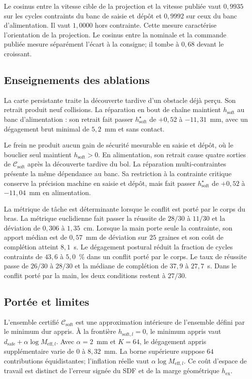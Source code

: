 Le cosinus entre la vitesse cible de la projection et la vitesse publiée vaut $0{,}9935$ sur les cycles contraints du banc de saisie et dépôt et $0{,}9992$ sur ceux du banc d'alimentation. Il vaut $1{,}0000$ hors contrainte. Cette mesure caractérise l'orientation de la projection. Le cosinus entre la nominale et la commande publiée mesure séparément l'écart à la consigne; il tombe à $0{,}68$ devant le croissant.

\subsection*{Enseignements des ablations}
La carte persistante traite la découverte tardive d'un obstacle déjà perçu. Son retrait produit neuf collisions. La réparation en bout de chaîne maintient $h_{\mathrm{soft}}$ au banc d'alimentation : son retrait fait passer $h_{\mathrm{soft}}^{\star}$ de $+0{,}52$ à $-11{,}31$~mm, avec un dégagement brut minimal de $5{,}2$~mm et sans contact.

Le frein ne produit aucun gain de sécurité mesurable en saisie et dépôt, où le bouclier seul maintient $h_{\mathrm{soft}}>0$. En alimentation, son retrait cause quatre sorties de $\mathcal{C}_{\mathrm{soft}}$ après la découverte tardive du bol. La réparation multi-contraintes présente la même dépendance au banc. Sa restriction à la contrainte critique conserve la précision machine en saisie et dépôt, mais fait passer $h_{\mathrm{soft}}^{\star}$ de $+0{,}52$ à $-11{,}04$~mm en alimentation.

La métrique de tâche est déterminante lorsque le conflit est porté par le corps du bras. La métrique euclidienne fait passer la réussite de $28/30$ à $11/30$ et la déviation de $0{,}306$ à $1{,}35$~cm. Lorsque la main porte seule la contrainte, son apport médian est de $0{,}57$~mm de déviation sur $25$ graines et son coût de complétion atteint $8{,}1$~s. Le dégagement postural réduit la fraction de cycles contraints de $43{,}6$ à $5{,}0$~\% dans un conflit porté par le corps. Le taux de réussite passe de $26/30$ à $28/30$ et la médiane de complétion de $37{,}9$ à $27{,}7$~s. Dans le conflit porté par la main, les deux conditions restent à $27/30$.

\subsection*{Portée et limites}
L'ensemble certifié $\mathcal{C}_{\mathrm{soft}}$ est une approximation intérieure de l'ensemble défini par le minimum dur appris. À la frontière $h_{\mathrm{soft},l}=0$, le minimum appris vaut $d_{\mathrm{safe}}+\alpha\log M_{\mathrm{eff},l}$. Avec $\alpha=2$~mm et $K=64$, le dégagement appris supplémentaire varie de $0$ à $8{,}32$~mm. La borne supérieure suppose $64$ contributions équidistantes; l'inflation réelle vaut $\alpha\log M_{\mathrm{eff},l}$. Ce coût d'espace de travail est distinct de l'erreur signée du \ac{SDF} et de la marge géométrique $h_{\mathrm{ex}}$.

